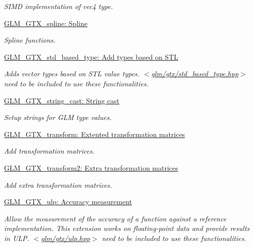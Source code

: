 \begin{DoxyCompactItemize}
\begin{DoxyCompactList}\small\item\em \-S\-I\-M\-D implementation of vec4 type. \end{DoxyCompactList}\item 
\hyperlink{group__gtx__spline}{\-G\-L\-M\-\_\-\-G\-T\-X\-\_\-spline\-: Spline}
\begin{DoxyCompactList}\small\item\em \-Spline functions. \end{DoxyCompactList}\item 
\hyperlink{group__gtx__std__based__type}{\-G\-L\-M\-\_\-\-G\-T\-X\-\_\-std\-\_\-based\-\_\-type\-: Add types based on S\-T\-L}
\begin{DoxyCompactList}\small\item\em \-Adds vector types based on \-S\-T\-L value types. $<$\hyperlink{std__based__type_8hpp}{glm/gtx/std\-\_\-based\-\_\-type.\-hpp}$>$ need to be included to use these functionalities. \end{DoxyCompactList}\item 
\hyperlink{group__gtx__string__cast}{\-G\-L\-M\-\_\-\-G\-T\-X\-\_\-string\-\_\-cast\-: String cast}
\begin{DoxyCompactList}\small\item\em \-Setup strings for \-G\-L\-M type values. \end{DoxyCompactList}\item 
\hyperlink{group__gtx__transform}{\-G\-L\-M\-\_\-\-G\-T\-X\-\_\-transform\-: Extented transformation matrices}
\begin{DoxyCompactList}\small\item\em \-Add transformation matrices. \end{DoxyCompactList}\item 
\hyperlink{group__gtx__transform2}{\-G\-L\-M\-\_\-\-G\-T\-X\-\_\-transform2\-: Extra transformation matrices}
\begin{DoxyCompactList}\small\item\em \-Add extra transformation matrices. \end{DoxyCompactList}\item 
\hyperlink{group__gtx__ulp}{\-G\-L\-M\-\_\-\-G\-T\-X\-\_\-ulp\-: Accuracy measurement}
\begin{DoxyCompactList}\small\item\em \-Allow the measurement of the accuracy of a function against a reference implementation. \-This extension works on floating-\/point data and provide results in \-U\-L\-P. $<$\hyperlink{ulp_8hpp}{glm/gtx/ulp.\-hpp}$>$ need to be included to use these functionalities. \end{DoxyCompactList}\item 

\end{DoxyCompactItemize}
